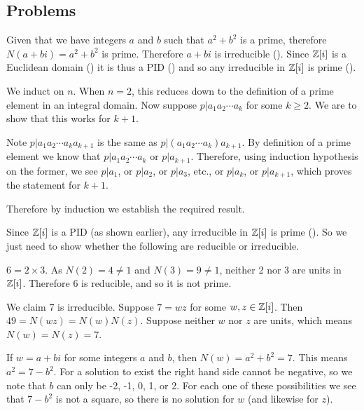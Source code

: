 \subsection*{Problems}
\begin{questions}
    \item Given that we have integers $a$ and $b$ such that $a^2 + b^2$ is a prime, therefore $N(a+bi) = a^2+b^2$ is prime. Therefore $a+bi$ is irreducible (). Since $\mathbb{Z}[i]$ is a Euclidean domain () it is thus a PID () and so any irreducible in $\mathbb{Z}[i]$ is prime ().

    \item We induct on $n$. When $n = 2$, this reduces down to the definition of a prime element in an integral domain. Now suppose $p \vert a_1a_2\cdots a_k$ for some $k \geq 2$. We are to show that this works for $k + 1$.

    Note $p \vert a_1a_2\cdots a_ka_{k+1}$ is the same as $p \vert (a_1a_2\cdots a_k)a_{k+1}$. By definition of a prime element we know that $p \vert a_1a_2\cdots a_k$ or $p \vert a_{k+1}$. Therefore, using induction hypothesis on the former, we see $p\vert a_1$, or $p\vert a_2$, or $p \vert a_3$, etc., or $p \vert a_k$, or $p \vert a_{k+1}$, which proves the statement for $k + 1$.

    Therefore by induction we establish the required result.

    \item Since $\mathbb{Z}[i]$ is a PID (as shown earlier), any irreducible in $\mathbb{Z}[i]$ is prime (). So we just need to show whether the following are reducible or irreducible.
    \begin{partquestions}{\alph*}
        \item $6 = 2 \times 3$. As $N(2) = 4 \neq 1$ and $N(3) = 9 \neq 1$, neither 2 nor 3 are units in $\mathbb{Z}[i]$. Therefore 6 is reducible, and so it is not prime.

        \item We claim 7 is irreducible. Suppose $7 = wz$ for some $w,z \in \mathbb{Z}[i]$. Then $49 = N(wz) = N(w)N(z)$. Suppose neither $w$ nor $z$ are units, which means $N(w) = N(z) = 7$.

        If $w = a+bi$ for some integers $a$ and $b$, then $N(w) = a^2+b^2 = 7$. This means $a^2 = 7 - b^2$. For a solution to exist the right hand side cannot be negative, so we note that $b$ can only be -2, -1, 0, 1, or 2. For each one of these possibilities we see that $7 - b^2$ is not a square, so there is no solution for $w$ (and likewise for $z$).


\end{partquestions}
\end{questions}

